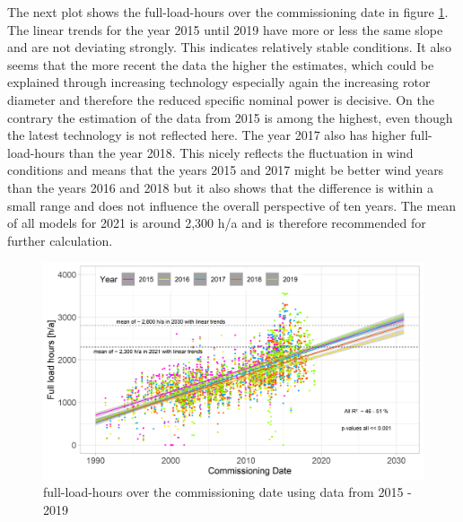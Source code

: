 \documentclass[a4paper,11pt]{article}
\begin{document}
The next plot shows the full-load-hours over the commissioning date in figure \ref{fig:full}. The linear trends for the year 2015 until 2019 have more or less the same slope and are not deviating strongly. This indicates relatively stable conditions. It also seems that the more recent the data the higher the estimates, which could be explained through increasing technology especially again the increasing rotor diameter and therefore the reduced specific nominal power is decisive. On the contrary the estimation of the data from 2015 is among the highest, even though the latest technology is not reflected here. The year 2017 also has higher full-load-hours than the year 2018. This nicely reflects the fluctuation in wind conditions and means that the years 2015 and 2017 might be better wind years than the years 2016 and 2018 but it also shows that the difference is within a small range and does not influence the overall perspective of ten years. The mean of all models for 2021 is around 2,300 h/a and is therefore recommended for further calculation.
\begin{figure}[H]

{\centering \includegraphics[width=1\linewidth]{data/Amprion/results_of_analysis/flh} 

}

\caption{full-load-hours over the commissioning date using data from 2015 - 2019}\label{fig:full}
\end{figure}
\end{document}
